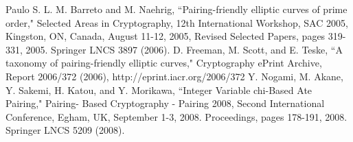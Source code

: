 \begin{thebibliography}{1}

Paulo S. L. M. Barreto and M. Naehrig, ``Pairing-friendly elliptic curves of prime order," Selected Areas in Cryptography, 12th International Workshop, SAC 2005, Kingston, ON, Canada, August 11-12, 2005, Revised Selected Papers, pages 319-331, 2005. Springer LNCS 3897 (2006).
D. Freeman, M. Scott, and E. Teske, ``A taxonomy of pairing-friendly elliptic curves," Cryptography ePrint Archive, Report 2006/372 (2006), http://eprint.iacr.org/2006/372
Y. Nogami, M. Akane, Y. Sakemi, H. Katou, and Y. Morikawa, ``Integer Variable chi-Based Ate Pairing," Pairing- Based Cryptography - Pairing 2008, Second International Conference, Egham, UK, September 1-3, 2008. Proceedings, pages 178-191, 2008. Springer LNCS 5209 (2008).


\end{thebibliography}


